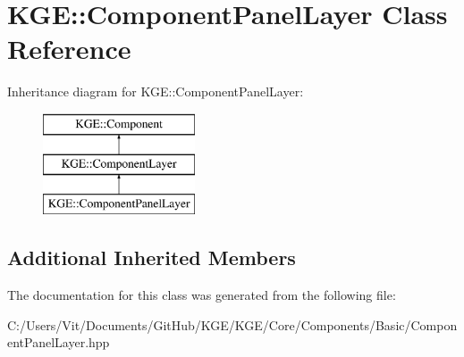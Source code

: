 \hypertarget{class_k_g_e_1_1_component_panel_layer}{\section{K\-G\-E\-:\-:Component\-Panel\-Layer Class Reference}
\label{class_k_g_e_1_1_component_panel_layer}
}
Inheritance diagram for K\-G\-E\-:\-:Component\-Panel\-Layer\-:\begin{figure}[H]
\begin{center}
\leavevmode
\includegraphics[height=3.000000cm]{class_k_g_e_1_1_component_panel_layer}
\end{center}
\end{figure}
\subsection*{Additional Inherited Members}


The documentation for this class was generated from the following file\-:\begin{DoxyCompactItemize}
\item 
C\-:/\-Users/\-Vit/\-Documents/\-Git\-Hub/\-K\-G\-E/\-K\-G\-E/\-Core/\-Components/\-Basic/Component\-Panel\-Layer.\-hpp\end{DoxyCompactItemize}
